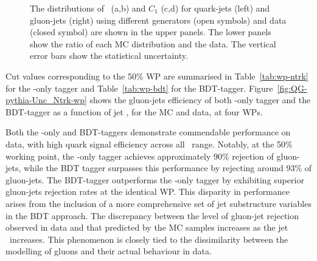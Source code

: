 \begin{figure}[htb]
	\caption[]{
		The distributions of \wtrk~(a,b) and $C_1$ (c,d) for quark-jets (left) and gluon-jets (right) using different generators (open symbols) and data (closed symbol) are shown in the upper panels. The lower panels show the ratio of each MC distribution and the data. The vertical error bars show the statistical uncertainty.%
		\label{fig:QG-roc-com1211}
	}
\end{figure}


\FloatBarrier
Cut values corresponding to the 50\% WP are summarised in Table~\ref{tab:wp-ntrk} for the \ntrk-only tagger and Table~\ref{tab:wp-bdt} for the BDT-tagger. Figure~\ref{fig:QG-pythia-Unc_Ntrk-wp} shows the gluon-jets efficiency of both \ntrk-only tagger and the BDT-tagger as a function of jet \pt, for the MC and data, at four WPs.


Both the \ntrk-only and BDT-taggers demonstrate commendable performance on data, with high quark signal efficiency across all \pt~range. Notably, at the 50\% working point, the \ntrk-only tagger achieves approximately 90\% rejection of gluon-jets, while the BDT tagger surpasses this performance by rejecting around 93\% of gluon-jets. The BDT-tagger outperforms the {\ntrk}-only tagger by exhibiting superior gluon-jets rejection rates at the identical WP. This disparity in performance arises from the inclusion of a more comprehensive set of jet substructure variables in the BDT approach. The discrepancy between the level of gluon-jet rejection observed in data and that predicted by the MC samples increases as the jet \pt~increases. This phenomenon is closely tied to the dissimilarity between the modelling of gluons and their actual behaviour in data.



\begin{table}[htb]
	\centering
	\caption{Cut values of \ntrk~at different working point in each of jet \pt~range}
	\label{tab:wp-ntrk}
\end{table}


